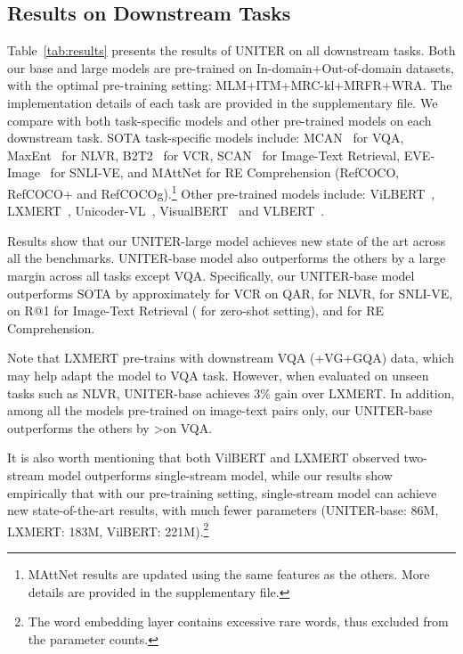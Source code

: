 \documentclass[runningheads]{llncs}
\begin{document}
 
\subsection{Results on Downstream Tasks}

Table~\ref{tab:results} presents the results of UNITER on all downstream tasks. 
Both our base and large models are pre-trained on In-domain+Out-of-domain datasets, with the optimal pre-training setting: MLM+ITM+MRC-kl+MRFR+WRA. The implementation details of each task are provided in the supplementary file.
We compare with both task-specific models and other pre-trained models on each downstream task. 
SOTA task-specific models include: MCAN~\cite{Yu_2019_CVPR} for VQA, MaxEnt~\cite{suhr2018corpus} for NLVR,  B2T2~\cite{alberti2019fusion} for VCR, SCAN~\cite{lee2018stacked} for Image-Text Retrieval, EVE-Image~\cite{xie2019visual} for SNLI-VE, and MAttNet for RE Comprehension (RefCOCO, RefCOCO+ and RefCOCOg).\footnote{MAttNet results are updated using the same features as the others. More details are provided in the supplementary file.}
Other pre-trained models include: ViLBERT~\cite{lu2019vilbert}, LXMERT~\cite{tan2019lxmert}, Unicoder-VL~\cite{li2019unicoder}, VisualBERT~\cite{li2019visualbert} and VLBERT~\cite{su2019vl}. 

Results show that our UNITER-large model achieves new state of the art across all the benchmarks. 
UNITER-base model also outperforms the others by a large margin across all tasks except VQA.
Specifically, our UNITER-base model outperforms SOTA  by approximately  for VCR on QAR,  for NLVR,  for SNLI-VE,   on R@1 for Image-Text Retrieval ( for zero-shot setting), and  for RE Comprehension.



Note that LXMERT pre-trains with downstream VQA (+VG+GQA) data, which may help adapt the model to VQA task. However, when evaluated on unseen tasks such as NLVR, UNITER-base achieves 3\% gain over LXMERT. 
In addition, among all the models pre-trained on image-text pairs only, our UNITER-base outperforms the others by \textgreater  on VQA.

It is also worth mentioning that both VilBERT and LXMERT observed two-stream model outperforms single-stream model, while our results show empirically that with our pre-training setting, single-stream model can achieve new state-of-the-art results, with much fewer parameters (UNITER-base: 86M, LXMERT: 183M, VilBERT: 221M).\footnote{The word embedding layer contains excessive rare words, thus excluded from the parameter counts.}
 
\end{document}

